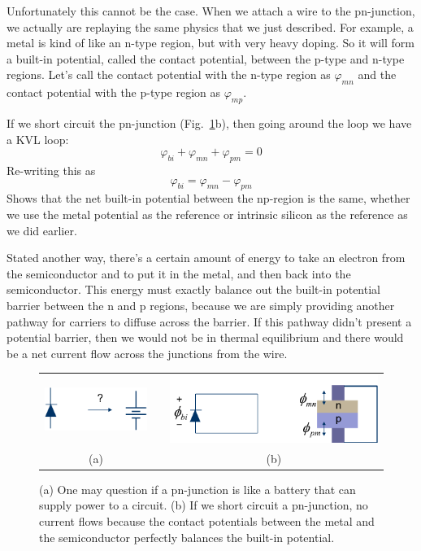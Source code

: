 Unfortunately this cannot be the case.  When we attach a wire to the pn-junction, we actually are replaying the same physics that we just described.  For example, a metal is kind of like an n-type region, but with very heavy doping.  So it will form a built-in potential, called the contact potential, between the p-type and n-type regions.  Let's call the contact potential with the n-type region as $\varphi_{mn}$ and the contact potential with the p-type region as $\varphi_{mp}$.  

If we short circuit the pn-junction (Fig.~\ref{fig:slide25}b), then going around the loop we have a KVL loop:
%
\begin{equation}
	\varphi_{bi} + \varphi_{mn} + \varphi_{pm} = 0
\end{equation}
%
Re-writing this as 
%
\begin{equation}
	\varphi_{bi} =  \varphi_{mn} - \varphi_{pm} 
\end{equation}
%
Shows that the net built-in potential between the np-region is the same, whether we use the metal potential as the reference or intrinsic silicon as the reference as we did earlier.  

Stated another way, there's a certain amount of energy to take an electron from the semiconductor and to put it in the metal, and then back into the semiconductor.  This energy must exactly balance out the built-in potential barrier between the n and p regions, because we are simply providing another pathway for carriers to diffuse across the barrier.  If this pathway didn't present a potential barrier,  then we would not be in thermal equilibrium and there would be a net current flow across the junctions from the wire.

\begin{figure}[tb]
\begin{center}
\begin{tabular}{ccc}
\includegraphics[width=.3\columnwidth]{slide25} & \hspace{.5cm} &
\includegraphics[width=.45\columnwidth]{slide26}\\
(a) &  & (b) \\
\end{tabular}
\end{center}
\caption{(a) One may question if a pn-junction is like a battery that can supply power to a circuit.  (b) If we short circuit a pn-junction, no current flows because the contact potentials between the metal and the semiconductor perfectly balances the built-in potential. } \label{fig:slide25}
\end{figure}

